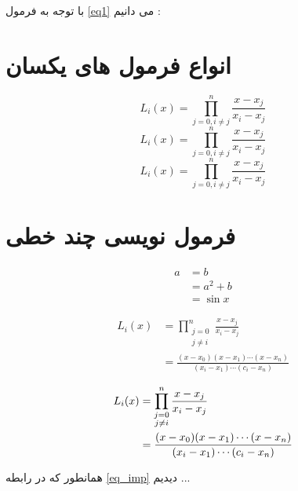 \documentclass[12pt]{article}
\begin{document}
با توجه به فرمول 
\eqref{eq1}
می دانیم :
\section{انواع فرمول های یکسان}
\[
L_i(x) = \prod_{j=0,i \neq j}^{n} \frac{x-x_j}{x_i - x_j}
\]
$$
L_i(x) = \prod_{j=0,i \neq j}^{n} \frac{x-x_j}{x_i - x_j}
$$
\begin{equation*}
	L_i(x) = \prod_{j=0,i \neq j}^{n} \frac{x-x_j}{x_i - x_j}
\end{equation*}

\section{فرمول نویسی چند خطی}
\begin{align*}
a & = b \\
& =a^2+b\\
& =\sin x
\end{align*}

\begin{align*}
L_i(x) &= \prod_{\substack{j=0\\j \neq i}}^{n} \frac{x-x_j}{x_i-x_j} \\
& = \frac{(x-x_0)(x-x_1)\cdots (x-x_n)}{(x_i - x_1)\cdots (c_i - x_n)}
\end{align*}

\begin{align}
	L_i(x) &= \prod_{\substack{j=0\\j \neq i}}^{n} \frac{x-x_j}{x_i-x_j} \notag\\
	& = \frac{(x-x_0)(x-x_1)\cdots (x-x_n)}{(x_i - x_1)\cdots (c_i - x_n)}\label{eq_imp}
\end{align}

همانطور که در رابطه
\eqref{eq_imp} 
دیدیم ...
\end{document}
